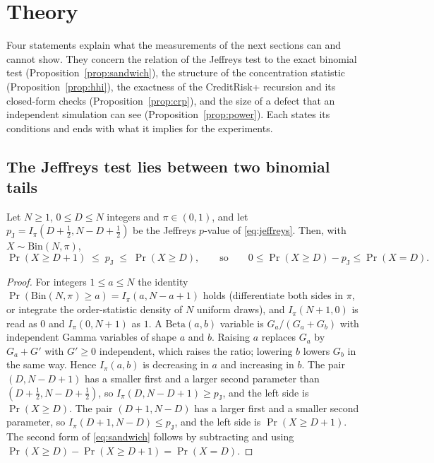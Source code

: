 \section{Theory}
\label{sec:theory}

Four statements explain what the measurements of the next sections can and cannot show. They concern the relation of the Jeffreys test to the exact binomial test (Proposition~\ref{prop:sandwich}), the structure of the concentration statistic (Proposition~\ref{prop:hhi}), the exactness of the CreditRisk+ recursion and its closed-form checks (Proposition~\ref{prop:crp}), and the size of a defect that an independent simulation can see (Proposition~\ref{prop:power}). Each states its conditions and ends with what it implies for the experiments.

\subsection{The Jeffreys test lies between two binomial tails}

\begin{proposition}\label{prop:sandwich}
Let $N\ge1$, $0\le D\le N$ integers and $\pi\in(0,1)$, and let $p_{\mathrm{J}}=I_\pi(D+\tfrac12,N-D+\tfrac12)$ be the Jeffreys $p$-value of \eqref{eq:jeffreys}. Then, with $X\sim\mathrm{Bin}(N,\pi)$,
\begin{equation}
  \Pr(X\ge D+1)\;\le\;p_{\mathrm{J}}\;\le\;\Pr(X\ge D),\qquad\text{so}\qquad 0\le \Pr(X\ge D)-p_{\mathrm{J}}\le\Pr(X=D).
  \label{eq:sandwich}
\end{equation}
\end{proposition}

\begin{proof}
For integers $1\le a\le N$ the identity $\Pr(\mathrm{Bin}(N,\pi)\ge a)=I_\pi(a,N-a+1)$ holds (differentiate both sides in $\pi$, or integrate the order-statistic density of $N$ uniform draws), and $I_\pi(N+1,0)$ is read as $0$ and $I_\pi(0,N+1)$ as $1$. A $\mathrm{Beta}(a,b)$ variable is $G_a/(G_a+G_b)$ with independent Gamma variables of shape $a$ and $b$. Raising $a$ replaces $G_a$ by $G_a+G'$ with $G'\ge0$ independent, which raises the ratio; lowering $b$ lowers $G_b$ in the same way. Hence $I_\pi(a,b)$ is decreasing in $a$ and increasing in $b$. The pair $(D,N-D+1)$ has a smaller first and a larger second parameter than $(D+\tfrac12,N-D+\tfrac12)$, so $I_\pi(D,N-D+1)\ge p_{\mathrm{J}}$, and the left side is $\Pr(X\ge D)$. The pair $(D+1,N-D)$ has a larger first and a smaller second parameter, so $I_\pi(D+1,N-D)\le p_{\mathrm{J}}$, and the left side is $\Pr(X\ge D+1)$. The second form of \eqref{eq:sandwich} follows by subtracting and using $\Pr(X\ge D)-\Pr(X\ge D+1)=\Pr(X=D)$.
\end{proof}

